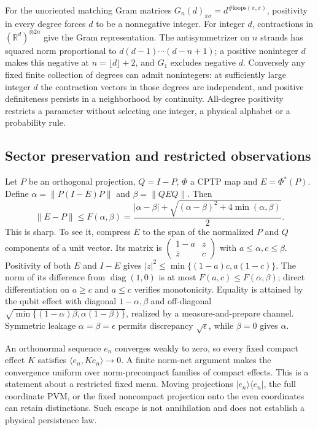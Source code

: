 For the unoriented matching Gram matrices $G_n(d)_{\pi\sigma}=d^{\#\text{loops}(\pi,\sigma)}$, positivity in every degree forces $d$ to be a nonnegative integer. For integer $d$, contractions in $(\mathbb R^d)^{\otimes2n}$ give the Gram representation. The antisymmetrizer on $n$ strands has squared norm proportional to $d(d-1)\cdots(d-n+1)$; a positive noninteger $d$ makes this negative at $n=\lfloor d\rfloor+2$, and $G_1$ excludes negative $d$. Conversely any fixed finite collection of degrees can admit nonintegers: at sufficiently large integer $d$ the contraction vectors in those degrees are independent, and positive definiteness persists in a neighborhood by continuity. All-degree positivity restricts a parameter without selecting one integer, a physical alphabet or a probability rule.

\subsection{Sector preservation and restricted observations}
\label{str:sector}
Let $P$ be an orthogonal projection, $Q=I-P$, $\Phi$ a CPTP map and $E=\Phi^*(P)$. Define $\alpha=\|P(I-E)P\|$ and $\beta=\|QEQ\|$. Then
\[
 \|E-P\|\le F(\alpha,\beta)
 =\frac{|\alpha-\beta|+\sqrt{(\alpha-\beta)^2+4\min(\alpha,\beta)}}2.
\]
This is sharp. To see it, compress $E$ to the span of the normalized $P$ and $Q$ components of a unit vector. Its matrix is $\left(\begin{smallmatrix}1-a&z\\\bar z&c\end{smallmatrix}\right)$ with $a\le\alpha,c\le\beta$. Positivity of both $E$ and $I-E$ gives
$|z|^2\le\min\{(1-a)c,a(1-c)\}$. The norm of its difference from $\operatorname{diag}(1,0)$ is at most $F(a,c)\le F(\alpha,\beta)$; direct differentiation on $a\ge c$ and $a\le c$ verifies monotonicity. Equality is attained by the qubit effect with diagonal $1-\alpha,\beta$ and off-diagonal $\sqrt{\min\{(1-\alpha)\beta,\alpha(1-\beta)\}}$, realized by a measure-and-prepare channel. Symmetric leakage $\alpha=\beta=\epsilon$ permits discrepancy $\sqrt\epsilon$, while $\beta=0$ gives $\alpha$.

An orthonormal sequence $e_n$ converges weakly to zero, so every fixed compact effect $K$ satisfies $\langle e_n,Ke_n\rangle\to0$. A finite norm-net argument makes the convergence uniform over norm-precompact families of compact effects. This is a statement about a restricted fixed menu. Moving projections $|e_n\rangle\langle e_n|$, the full coordinate PVM, or the fixed noncompact projection onto the even coordinates can retain distinctions. Such escape is not annihilation and does not establish a physical persistence law.

